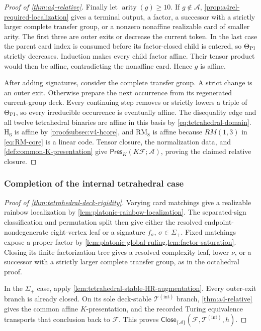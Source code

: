 \documentclass[11pt,letterpaper,onecolumn]{article}
\theoremstyle{plain}
\theoremstyle{definition}
\theoremstyle{remark}
\newcommand{\cF}{\mathcal F}
\newcommand{\cA}{\mathscr A}
\newcommand{\TetInt}{{\mathcal T^{(\mathrm{int})}}}
\newcommand{\PresK}{\mathsf{Pres}_{K}}
\newcommand{\Close}{\mathsf{Close}}
\newcommand{\arity}{\operatorname{arity}}
\newcommand{\RMcore}{\mathrm{RM}_8}
\newcommand{\Hcore}{\mathrm{H}_6}
\begin{document}
\begin{proof}[Proof of \cref{thm:a4-relative}]
Finally let \(\arity(g)\ge10\).  If \(g\notin\cA\),
\cref{prop:a4rel-required-localization} gives a terminal output, a factor, a successor with a strictly larger
complete transfer group, or a nonzero nonaffine realizable card of smaller arity.  The
first three are outer exits or decrease the current token.  In the last
case the parent card index is consumed before its factor-closed child is
entered, so \(\Theta_{\rm Pl}\) strictly decreases.  Induction makes every
child factor affine. Their tensor product would then be affine, contradicting
the nonaffine card.  Hence \(g\) is affine.

After adding signatures, consider the complete transfer group.  A strict
change is an outer exit. Otherwise prepare the next occurrence from its
regenerated current-group deck.  Every continuing step removes or
strictly lowers a triple of \(\Theta_{\rm Pl}\), so every irreducible
occurrence is eventually affine.  The disequality edge and all twelve
tetrahedral binaries are affine in this basis by
\cref{eq:tetrahedral-domain}. \(\Hcore\) is affine by
\cref{proofsubsec:v4-hcore}, and \(\RMcore\) is affine because
\(RM(1,3)\) in \cref{eq:RM-core} is a linear code. Tensor closure,
the normalization data, and
\cref{def:common-K-presentation} give \(\PresK(K\cF;\cA)\), proving the
claimed relative closure.
\end{proof}



\subsubsection{Completion of the internal tetrahedral case}

\begin{proof}[Proof of \cref{thm:tetrahedral-deck-rigidity}]
Varying card matchings give a realizable rainbow localization by
\cref{lem:platonic-rainbow-localization}.  The separated-sign classification and permutation split
then give either the resolved endpoint-nondegenerate eight-vertex leaf or a
signature \(f_\sigma\), \(\sigma\in\Sigma_+\).  Fixed matchings expose a proper
factor by \cref{lem:platonic-global-ruling,lem:factor-saturation}. Closing
its finite factorization tree gives a resolved complexity leaf, lower \(\nu\), or a successor with a strictly larger
complete transfer group, as in the octahedral proof.

In the \(\Sigma_+\) case, apply
\cref{lem:tetrahedral-stable-HR-augmentation}.  Every outer-exit branch is
already closed.  On its sole deck-stable \(\TetInt\) branch,
\cref{thm:a4-relative} gives the common affine \(K\)-presentation, and the
recorded Turing equivalence transports that conclusion back to \(\cF\).
  This proves \(\Close_{\{\cA\}}(\cF,\TetInt,h)\).
\end{proof}
\end{document}

